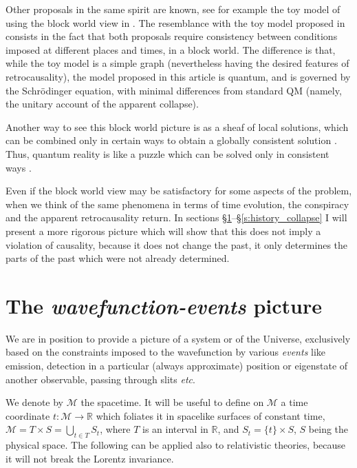 \documentclass[11pt]{amsart}
\theoremstyle{definition}
\theoremstyle{plain}
\begin{document}
Other proposals in the same spirit are known, see for example the toy model of using the block world view in \cite{price2008toyRetrocausality}. The resemblance with the toy model proposed in \cite{price2008toyRetrocausality} consists in the fact that both proposals require consistency between conditions imposed at different places and times, in a block world. The difference is that, while the toy model is a simple graph (nevertheless having the desired features of retrocausality), the model proposed in this article is quantum, and is governed by the Schr\"odinger equation, with minimal differences from standard QM (namely, the unitary account of the apparent collapse).

Another way to see this block world picture is as a sheaf of local solutions, which can be combined only in certain ways to obtain a globally consistent solution \cite{Sto12QMc}. Thus, quantum reality is like a puzzle which can be solved only in consistent ways \cite{Sto13bSpringer}.

Even if the block world view may be satisfactory for some aspects of the problem, when we think of the same phenomena in terms of time evolution, the conspiracy and the apparent retrocausality return.
In sections \S\ref{s:wavefunction-events-picture}--\S\ref{s:history_collapse} I will present a more rigorous picture which will show that this does not imply a violation of causality, because it does not change the past, it only determines the parts of the past which were not already determined.


\section{The \emph{wavefunction-events} picture}
\label{s:wavefunction-events-picture}

We are in position to provide a picture of a system or of the Universe, exclusively based on the constraints imposed to the wavefunction by various \emph{events} like emission, detection in a particular (always approximate) position or eigenstate of another observable, passing through slits \textit{etc}.

We denote by $\mathcal M$ the spacetime. It will be useful to define on $\mathcal M$ a time coordinate $t:\mathcal M\to\mathbb{R}$ which foliates it in spacelike surfaces of constant time, $\mathcal M=T\times S=\bigcup_{t\in T} S_t$, where $T$ is an interval in $\mathbb{R}$, and $S_t=\{t\}\times S$, $S$ being the physical space. The following can be applied also to relativistic theories, because it will not break the Lorentz invariance.
\end{document}
